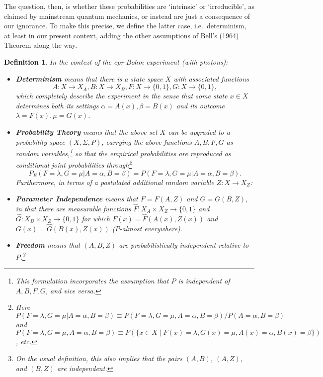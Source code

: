 \documentclass[11pt]{article}
\newtheorem{Definition}{Definition}[section]
\newcommand{\epr}{{\sc epr}}
\newcommand{\qm}{quantum mechanics}
\newcommand{\raw}{\rightarrow} \newcommand{\rat}{\mapsto}
\newcommand{\x}{\times} \newcommand{\hb}{\hbar}
\newcommand{\al}{\alpha} \newcommand{\bt}{L\beta}
\newcommand{\lm}{\lambda} \newcommand{\Lm}{\Lambda}
\newcommand{\Sg}{\Sigma} \newcommand{\ta}{\tau} \newcommand{\ph}{\phi}
\begin{document}
The question, then, is whether these probabilities are `intrinsic' or `irreducible', as claimed by mainstream \qm, or instead are just a consequence of our ignorance. To make this precise, we  define the latter case, i.e.\ determinism, at least in our present context, adding the other assumptions of Bell's (1964) Theorem along the way.
\begin{Definition}\label{Belldefs}
In the context of the  \epr-Bohm experiment (with photons):
\begin{itemize}
\item 
\textbf{Determinism} means that there is a state space $X$  with associated functions 
\begin{equation}
A: X\raw X_A, B:X\raw X_B, F:X\raw\{0,1\}, G:X\raw\{0,1\},\label{ABFG}
\end{equation}
which completely describe the experiment in the sense that some state $x\in X$ determines \emph{both} its settings $\al=A(x),\beta=B(x)$ \emph{and} its outcome $\lm=F(x),\mu=G(x)$. 
\item
\textbf{Probability Theory} means that the above set $X$ can be upgraded to a probability space $(X,\Sg,P)$, carrying the above functions $A,B,F,G$ as random variables,\footnote{This formulation incorporates the assumption that $P$ is independent of $A,B,F,G$, and \emph{vice versa}. }
 so that the empirical  probabilities are reproduced as conditional joint probabilities through\footnote{Here 
$P(F=\lm,G=\mu|A=\al,B=\beta)\equiv P(F=\lm,G=\mu,A=\al,B=\beta)/P(A=\al,B=\beta)$ and 
$P(F=\lm,G=\mu,A=\al,B=\beta)\equiv P(\{x\in X\mid F(x)=\lm,G(x)=\mu,A(x)=\al,B(x)=\beta\})$, etc.}
\begin{equation}
P_E(F=\lm,G=\mu|A=\al,B=\beta)= P(F=\lm,G=\mu|A=\al,B=\beta). \label{PEP}
\end{equation}
Furthermore, in terms of a postulated additional random variable $Z:X\raw X_Z$:
\item \textbf{Parameter Independence}  means   that
$F=F(A,Z)$ and $G=G(B,Z)$,
 in  that there are measurable functions $\hat{F}:X_A \x X_Z\raw \{0,1\}$ and $\hat{G}:X_B\x X_Z\raw \{0,1\}$
  for which  $F(x)=\hat{F}(A(x),Z(x))$ and $G(x)=\hat{G}(B(x),Z(x))$ ($P$-almost everywhere).
\item \textbf{Freedom} means that
 $(A,B,Z)$ are probabilistically independent relative to  $P$.\footnote{On the usual definition, this also implies that the pairs $(A,B)$, $(A,Z)$, and $(B,Z)$ are independent.}
\end{itemize}
\end{Definition}
\end{document}
